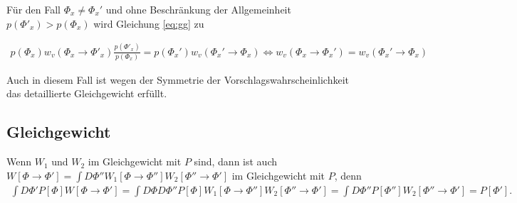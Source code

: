 \documentclass[10pt,a4paper]{article}
\begin{document}
Für den Fall $\Phi_x \neq \Phi_x'$ und ohne Beschränkung der Allgemeinheit $p(\Phi'_x)>p(\Phi_x)$ wird Gleichung \ref{eq:gg} zu

\begin{align*}
		p(\Phi_x) w_v(\Phi_x\to\Phi'_x) \frac{p(\Phi'_x)}{p(\Phi_x)} = p(\Phi_x') w_v(\Phi_x'\to\Phi_x)
		\Leftrightarrow w_v(\Phi_x\to\Phi_x')=w_v(\Phi_x'\to\Phi_x)
\end{align*}

Auch in diesem Fall ist wegen der Symmetrie der Vorschlagswahrscheinlichkeit das detaillierte Gleichgewicht erfüllt.

\subsection{Gleichgewicht}

Wenn $W_1$ und $W_2$ im Gleichgewicht mit $P$ sind, dann ist auch\\
 $W[\Phi\to \Phi']=\int D\Phi'' W_1[\Phi\to \Phi''] W_2[\Phi''\to\Phi']$
im Gleichgewicht mit $P$, denn
\begin{align*}
\int D\Phi'P[\Phi] W[\Phi\to \Phi'] = \int D\Phi D\Phi'' P[\Phi] W_1[\Phi\to \Phi''] W_2[\Phi''\to\Phi'] = \int D\Phi'' P[\Phi''] W_2[\Phi''\to\Phi'] = P[\Phi'].
\end{align*}
\end{document}
